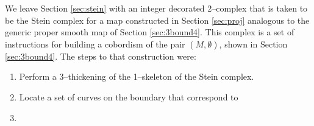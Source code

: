 We leave Section \ref{sec:stein} with an integer decorated 2--complex that is taken to be the Stein complex for a map constructed in Section \ref{sec:proj} analogous to the generic proper smooth map of Section \ref{sec:3bound4}.
This complex is a set of instructions for building a cobordism of the pair $(M,\emptyset)$, shown in Section \ref{sec:3bound4}.
The steps to that construction were:
\begin{enumerate}
	\item Perform a 3--thickening of the 1--skeleton of the Stein complex.
	\item Locate a set of curves on the boundary that correspond to 
	\item
	
\end{enumerate}